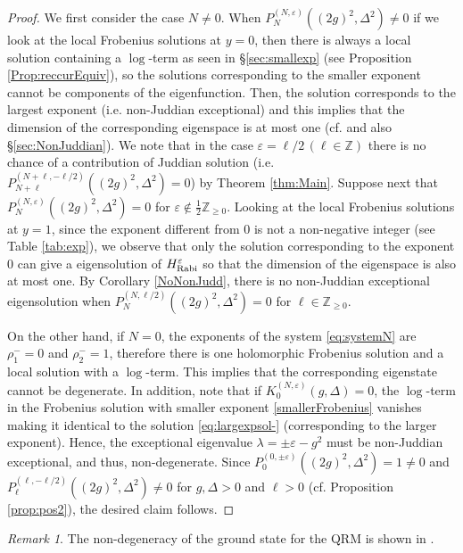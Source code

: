 \documentclass[11pt]{article}
\numberwithin{equation}{section}
\newcommand{\Z}{\mathbb{Z}} %
\newcommand{\e}{\varepsilon}
\newcommand{\HRabi}[1]{H_{\text{\upshape Rabi}}^{#1}} %
\newcommand{\cp}[2]{P^{(#1)}_{#2}} %
\theoremstyle{plain}
\theoremstyle{definition}
\theoremstyle{remark}
\newtheorem{rem}{Remark}[section]
\begin{document}
\begin{proof}
  We first consider the case \(N \ne 0 \).
  When $P_N^{(N,\e)}((2g)^2,\Delta^2)\ne0$ if we look at the local Frobenius solutions at $y=0$,
  then there is always a local solution containing a $\log$-term as seen in \S \ref{sec:smallexp}
  (see Proposition \ref{Prop:reccurEquiv}),
  so the solutions corresponding to the smaller exponent cannot be components of the eigenfunction.
  Then, the solution corresponds to the largest exponent (i.e. non-Juddian exceptional)
  and this implies that the dimension of the corresponding eigenspace is at most one
  (cf. \cite{B2011PRL,ZXGBGL2014} and also \S \ref{sec:NonJuddian}).
  We note that in the case \(\e = \ell/2 \, (\ell \in \Z)\) there is no chance of a contribution of Juddian solution
  (i.e. $P_{N+\ell}^{(N+\ell,-\ell/2)}((2g)^2,\Delta^2) =0$) by Theorem \ref{thm:Main}.
  Suppose next that $P_N^{(N,\e)}((2g)^2,\Delta^2)=0$ for $\e\notin \frac12\Z_{\geq0}$.
  Looking at the local Frobenius solutions at $y=1$,
  since the exponent different from $0$ is not a non-negative integer (see Table \ref{tab:exp}),
  we observe that only the solution corresponding to the exponent $0$ can give a eigensolution of $\HRabi{\e}$
  so that the dimension of the eigenspace is also at most one.
  By Corollary \ref{NoNonJudd}, there is no non-Juddian exceptional eigensolution
  when $P_N^{(N,\ell/2)}((2g)^2,\Delta^2)=0$ for $\ell \in \Z_{\geq0}$.

  On the other hand, if $N=0$, the exponents of the system \eqref{eq:systemN} are $\rho_1^- = 0$ and $ \rho_2^- = 1$,
  therefore there is one holomorphic Frobenius solution and a local solution with a \(\log\)-term.
  This implies that the corresponding eigenstate cannot be degenerate.
  In addition, note that if $K^{(N,\e)}_0(g, \Delta)=0$,
  the $\log$-term in the Frobenius solution with smaller exponent \eqref{smallerFrobenius} vanishes
  making it identical to the solution \eqref{eq:largexpsol-} (corresponding to the larger exponent).
  Hence, the exceptional eigenvalue $\lambda = \pm\e-g^2$ must be non-Juddian exceptional, and thus, non-degenerate.
  Since $\cp{0,\pm \e}{0}((2g)^2,\Delta^2) = 1 \not=0$   and \(\cp{\ell,-\ell/2}{\ell}((2g)^2,\Delta^2) \not= 0 \) for \(g,\Delta>0 \)
    and \(\ell > 0 \) (cf. Proposition \ref{prop:pos2}), the desired claim follows. 
\end{proof}

\begin{rem}
The non-degeneracy of the ground state for the QRM is shown in \cite{HH2012}.
\end{rem}
\end{document}
